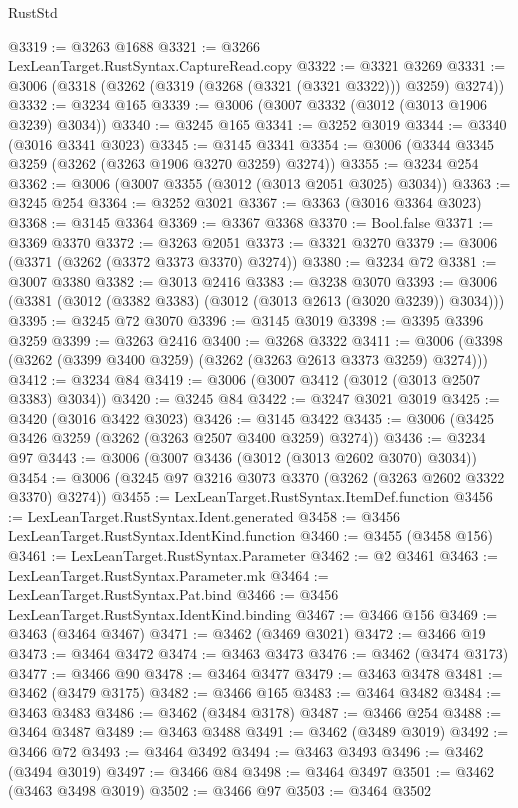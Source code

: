 \begin{lexlean}{RustStd}
\begin{coremodule}
@3319 := @3263 @1688
@3321 := @3266 LexLeanTarget.RustSyntax.CaptureRead.copy
@3322 := @3321 @3269
@3331 := @3006 (@3318 (@3262 (@3319 (@3268 (@3321 (@3321 @3322))) @3259) @3274))
@3332 := @3234 @165
@3339 := @3006 (@3007 @3332 (@3012 (@3013 @1906 @3239) @3034))
@3340 := @3245 @165
@3341 := @3252 @3019
@3344 := @3340 (@3016 @3341 @3023)
@3345 := @3145 @3341
@3354 := @3006 (@3344 @3345 @3259 (@3262 (@3263 @1906 @3270 @3259) @3274))
@3355 := @3234 @254
@3362 := @3006 (@3007 @3355 (@3012 (@3013 @2051 @3025) @3034))
@3363 := @3245 @254
@3364 := @3252 @3021
@3367 := @3363 (@3016 @3364 @3023)
@3368 := @3145 @3364
@3369 := @3367 @3368
@3370 := Bool.false
@3371 := @3369 @3370
@3372 := @3263 @2051
@3373 := @3321 @3270
@3379 := @3006 (@3371 (@3262 (@3372 @3373 @3370) @3274))
@3380 := @3234 @72
@3381 := @3007 @3380
@3382 := @3013 @2416
@3383 := @3238 @3070
@3393 := @3006 (@3381 (@3012 (@3382 @3383) (@3012 (@3013 @2613 (@3020 @3239)) @3034)))
@3395 := @3245 @72 @3070
@3396 := @3145 @3019
@3398 := @3395 @3396 @3259
@3399 := @3263 @2416
@3400 := @3268 @3322
@3411 := @3006 (@3398 (@3262 (@3399 @3400 @3259) (@3262 (@3263 @2613 @3373 @3259) @3274)))
@3412 := @3234 @84
@3419 := @3006 (@3007 @3412 (@3012 (@3013 @2507 @3383) @3034))
@3420 := @3245 @84
@3422 := @3247 @3021 @3019
@3425 := @3420 (@3016 @3422 @3023)
@3426 := @3145 @3422
@3435 := @3006 (@3425 @3426 @3259 (@3262 (@3263 @2507 @3400 @3259) @3274))
@3436 := @3234 @97
@3443 := @3006 (@3007 @3436 (@3012 (@3013 @2602 @3070) @3034))
@3454 := @3006 (@3245 @97 @3216 @3073 @3370 (@3262 (@3263 @2602 @3322 @3370) @3274))
@3455 := LexLeanTarget.RustSyntax.ItemDef.function
@3456 := LexLeanTarget.RustSyntax.Ident.generated
@3458 := @3456 LexLeanTarget.RustSyntax.IdentKind.function
@3460 := @3455 (@3458 @156)
@3461 := LexLeanTarget.RustSyntax.Parameter
@3462 := @2 @3461
@3463 := LexLeanTarget.RustSyntax.Parameter.mk
@3464 := LexLeanTarget.RustSyntax.Pat.bind
@3466 := @3456 LexLeanTarget.RustSyntax.IdentKind.binding
@3467 := @3466 @156
@3469 := @3463 (@3464 @3467)
@3471 := @3462 (@3469 @3021)
@3472 := @3466 @19
@3473 := @3464 @3472
@3474 := @3463 @3473
@3476 := @3462 (@3474 @3173)
@3477 := @3466 @90
@3478 := @3464 @3477
@3479 := @3463 @3478
@3481 := @3462 (@3479 @3175)
@3482 := @3466 @165
@3483 := @3464 @3482
@3484 := @3463 @3483
@3486 := @3462 (@3484 @3178)
@3487 := @3466 @254
@3488 := @3464 @3487
@3489 := @3463 @3488
@3491 := @3462 (@3489 @3019)
@3492 := @3466 @72
@3493 := @3464 @3492
@3494 := @3463 @3493
@3496 := @3462 (@3494 @3019)
@3497 := @3466 @84
@3498 := @3464 @3497
@3501 := @3462 (@3463 @3498 @3019)
@3502 := @3466 @97
@3503 := @3464 @3502

\end{coremodule}
\end{lexlean}
